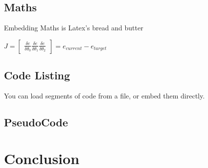 \documentclass[10pt, a4paper]{article}
\begin{document}
    
	\subsection{Maths}
    Embedding Maths is Latex's bread and butter    
    
    {\centering \Large \(
        J = \begin{bmatrix}
            \frac{\delta e}{\delta \theta _0}
            \frac{\delta e}{\delta \theta _1}
            \frac{\delta e}{\delta \theta _2}
        \end{bmatrix}
        = e_{current} - e_{target} 
    \)\par}
	
	\subsection{Code Listing}
    You can load segments of code from a file, or embed them directly.
    

    
\subsection{PseudoCode}


	
\section{Conclusion}	


		
\end{document}
